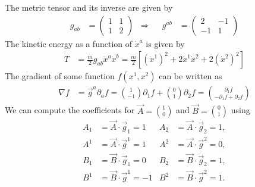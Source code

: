 \documentclass[english, parskip=full]{scrartcl}
\newcommand{\kla}{}
\begin{document}
The metric tensor and its inverse are given by
\begin{align}
g_{ab} &= \begin{pmatrix}
1&1 \\ 1&2
\end{pmatrix}&\Rightarrow&& g^{ab} &= \begin{pmatrix}
2&-1 \\ -1&1
\end{pmatrix} \label{eqn:Metrik}
\end{align}
The kinetic energy as a function of $\dot{x}^a$ is given by
\begin{align}
T &= \frac{m}{2}g_{ab}\dot{x}^a\dot{x}^b = \frac{m}{2}\kla\left[ {(\dot{x}^1)^2 + 2\dot{x}^1\dot{x}^2 + 2(\dot{x}^2)^2} \right] \label{eqn:Kinetische Energie von xdot oben a}
\end{align}
The gradient of some function $f(x^1,x^2)$ can be written as
\begin{align}
\nabla f &= \vec{g}^a\partial_a f = \binom{1}{-1}\partial_1f+\binom{0}{1}\partial_2f = \binom{\partial_1f}{-\partial_1f+\partial_2f} \label{eqn:Gradient}
\end{align}
We can compute the coefficients for $\vec{A}=\binom{1}{0}$ and $\vec{B}=\binom{0}{1}$ using
\begin{align}
A_1 &= \vec{A}\cdot\vec{g}_1 = 1 & A_2 &= \vec{A}\cdot\vec{g}_2 = 1,\\
A^1 &= \vec{A}\cdot\vec{g}^1 = 1 & A^2 &= \vec{A}\cdot\vec{g}^2 = 0,\\
B_1 &= \vec{B}\cdot\vec{g}_1 = 0 & B_2 &= \vec{B}\cdot\vec{g}_2 = 1,\\
B^1 &= \vec{B}\cdot\vec{g}^1 = -1 & B^2 &= \vec{B}\cdot\vec{g}^2 = 1.
\end{align}
\end{document}
